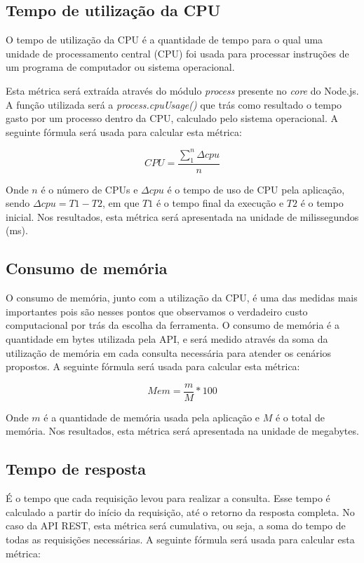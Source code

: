\subsection*{Tempo de utilização da CPU}

O tempo de utilização da CPU é a quantidade de tempo para o qual uma unidade de processamento central (CPU) foi usada para processar instruções de um programa de computador ou sistema operacional.

Esta métrica será extraída através do módulo \textit{process} presente no \textit{core} do Node.js. A função utilizada será a \textit{process.cpuUsage()} que trás como resultado o tempo gasto por um processo dentro da CPU, calculado pelo sistema operacional. A seguinte fórmula será usada para calcular esta métrica: 

$$ CPU = \frac{\sum\limits_{1}^{n} \Delta cpu}{n} $$

Onde $n$ é o número de CPUs e $\Delta cpu$ é o tempo de uso de CPU pela aplicação, sendo $\Delta cpu = T1 - T2$, em que $T1$ é o tempo final da execução e $T2$ é o tempo inicial. Nos resultados, esta métrica será apresentada na unidade de milissegundos (ms).

\subsection*{Consumo de memória}

O consumo de memória, junto com a utilização da CPU, é uma das medidas mais importantes pois são nesses pontos que observamos o verdadeiro custo computacional por trás da escolha da ferramenta. O consumo de memória é a quantidade em bytes utilizada pela API, e será medido através da soma da utilização de memória em cada consulta necessária para atender os cenários propostos. A seguinte fórmula será usada para calcular esta métrica: 

$$ Mem = \frac{m}{M}*100 $$

Onde $m$ é a quantidade de memória usada pela aplicação e $M$ é o total de memória. Nos resultados, esta métrica será apresentada na unidade de megabytes.

\subsection*{Tempo de resposta}

É o tempo que cada requisição levou para realizar a consulta. Esse tempo é calculado a partir do início da requisição, até o retorno da resposta completa. No caso da API REST, esta métrica será cumulativa, ou seja, a soma do tempo de todas as requisições necessárias. A seguinte fórmula será usada para calcular esta métrica: 

